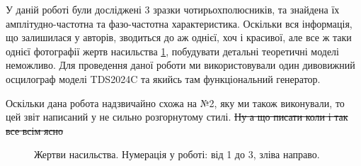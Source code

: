 
У даній роботі були досліджені 3 зразки чотирьохполюсників, та знайдена їх амплітудно-частотна та фазо-частотна характеристика. Оскільки вся інформація, що залишилася у авторів, зводиться до аж однієї, хоч і красивої, але все ж таки однієї фотографії жертв насильства \ref{photo}, побудувати детальні теоретичні моделі неможливо. Для проведення даної роботи ми використовували один дивовижний осцилограф моделі TDS2024C та якийсь там функціональний генератор.

Оскільки дана робота надзвичайно схожа на №2, яку ми також виконували, то цей звіт написаний у не сильно розгорнутому стилі. \sout{Ну а що писати коли і так все всім ясно}

\begin{figure}[h]
\caption{Жертви насильства. Нумерація у роботі: від 1 до 3, зліва направо.}
\label{photo}
\end{figure}